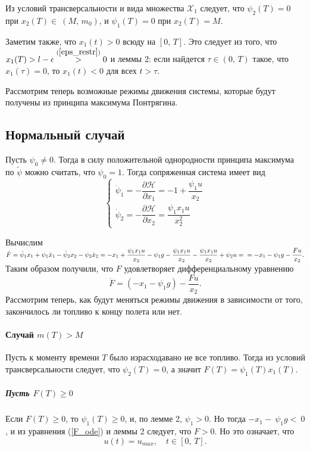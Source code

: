 \documentclass[16pt]{article}
\newcommand\X{\mathcal{X}}
\begin{document}
Из условий трансверсальности и вида множества $\X_1$ следует, что $\psi_2(T) = 0$ при $x_2(T)\in~(M,\,m_0)$, и
$\psi_1(T) = 0$ при $x_2(T) = M$.

Заметим также, что $x_1(t) > 0$ всюду на $[0,\,T]$. Это следует из того, что $x_1(T) > l - \epsilon 
\overset{(\ref{eps_restr})}{>} 0$ и леммы 2: если найдется $\tau \in (0,\,T)$ такое, что $x_1(\tau) = 0$, 
то $x_1(t) < 0$ для всех $t > \tau$.

Рассмотрим теперь возможные режимы движения системы, которые будут получены из принципа максимума Понтрягина.
\subsection{Нормальный случай}
Пусть $\psi_0 \not = 0$. Тогда в силу положительной однородности принципа максимума по $\tilde{\psi}$ можно считать,
что $\psi_0 = 1$. Тогда сопряженная система имеет вид 
\begin{equation}
\begin{cases} \label{1_conj_sys1}
\dot{\psi}_1 = -\dfrac{\partial \mathcal{H}}{\partial x_1} = -1 + \dfrac{\psi_1u}{x_2}\\
\dot{\psi}_2 = -\dfrac{\partial \mathcal{H}}{\partial x_2} = \dfrac{\psi_1 x_1 u}{x_2^2}
\end{cases}
\end{equation}

Вычислим $\dot{F} = \dot{\psi}_1x_1 + \psi_1\dot{x}_1 - \dot{\psi}_2x_2 - \psi_2\dot{x}_2 = -x_1 +
\dfrac{\psi_1x_1u}{x_2} - \psi_1 g - \dfrac{\psi_1x_1u}{x_2} - \dfrac{\psi_1x_1u}{x_2} + \psi_2u = \\
=-x_1 - \psi_1g - \dfrac{Fu}{x_2}.$ Таким образом получили, что $F$ удовлетворяет дифференциальному уравнению
\begin{equation} \label{F_ode}
\dot{F} = (-x_1 - \psi_1g) - \dfrac{Fu}{x_2}.
\end{equation}
Рассмотрим теперь, как будут меняться режимы движения в зависимости от того, закончилось ли топливо к концу полета
или нет.
\paragraph{Случай $m(T) > M$}
Пусть к моменту времени $T$ было израсходавано не все топливо. Тогда из условий трансверсальности следует, что
$\psi_2(T) = 0$, а значит $F(T) = \psi_1(T)x_1(T)$. 

\subparagraph{Пусть $F(T) \geqslant 0$} Если $F(T) \geqslant 0$, то $\psi_1(T) \geqslant 0$, и, по лемме 2, 
$\psi_1 > 0$. Но тогда
$-x_1 -~\psi_1g <~0$, и из уравнения (\ref{F_ode}) и леммы 2 следует, что $F > 0$. Но это означает, что
$$u(t) = u_{max}, \quad t \in [0,\,T].$$
\end{document}
